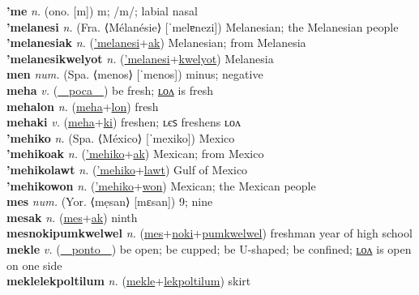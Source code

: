 \textbf{'me} \textit{n.} (ono. [m])
m; /m/; labial nasal \label{'me} \\
\textbf{'melanesi} \textit{n.} (Fra. ⟨Mélanésie⟩ [ˈmelɐnezi])
Melanesian; the Melanesian people \label{'melanesi} \\
\textbf{'melanesiak} \textit{n.} (\hyperref['melanesi]{'melanesi}+\hyperref[ak]{ak})
Melanesian; from Melanesia \label{'melanesiak} \\
\textbf{'melanesikwelyot} \textit{n.} (\hyperref['melanesi]{'melanesi}+\hyperref[kwelyot]{kwelyot})
Melanesia \label{'melanesikwelyot} \\
\textbf{men} \textit{num.} (Spa. ⟨menos⟩ [ˈmenos])
minus; negative \label{men} \\
\textbf{meha} \textit{v.} (\hyperref[poca]{~~poca~~})
be fresh; \hyperref[mehalon]{ʟᴏᴧ} is fresh \label{meha} \\
\textbf{mehalon} \textit{n.} (\hyperref[meha]{meha}+\hyperref[lon]{lon})
fresh \label{mehalon} \\
\textbf{mehaki} \textit{v.} (\hyperref[meha]{meha}+\hyperref[ki]{ki})
freshen; ʟєꜱ freshens ʟᴏᴧ \label{mehaki} \\
\textbf{'mehiko} \textit{n.} (Spa. ⟨México⟩ [ˈmexiko])
Mexico \label{'mehiko} \\
\textbf{'mehikoak} \textit{n.} (\hyperref['mehiko]{'mehiko}+\hyperref[ak]{ak})
Mexican; from Mexico \label{'mehikoak} \\
\textbf{'mehikolawt} \textit{n.} (\hyperref['mehiko]{'mehiko}+\hyperref[lawt]{lawt})
Gulf of Mexico \label{'mehikolawt} \\
\textbf{'mehikowon} \textit{n.} (\hyperref['mehiko]{'mehiko}+\hyperref[won]{won})
Mexican; the Mexican people \label{'mehikowon} \\
\textbf{mes} \textit{num.} (Yor. ⟨mẹsan⟩ [mɛsan])
9; nine \label{mes} \\
\textbf{mesak} \textit{n.} (\hyperref[mes]{mes}+\hyperref[ak]{ak})
ninth \label{mesak} \\
\textbf{mesnokipumkwelwel} \textit{n.} (\hyperref[mes]{mes}+\hyperref[noki]{noki}+\hyperref[pumkwelwel]{pumkwelwel})
freshman year of high school \label{mesnokipumkwelwel} \\
\textbf{mekle} \textit{v.} (\hyperref[ponto]{~~ponto~~})
be open; be cupped; be U-shaped; be confined; \hyperref[meklelon]{ʟᴏᴧ} is open on one side \label{mekle} \\
\textbf{meklelekpoltilum} \textit{n.} (\hyperref[mekle]{mekle}+\hyperref[lekpoltilum]{lekpoltilum})
skirt \label{meklelekpoltilum} \\
